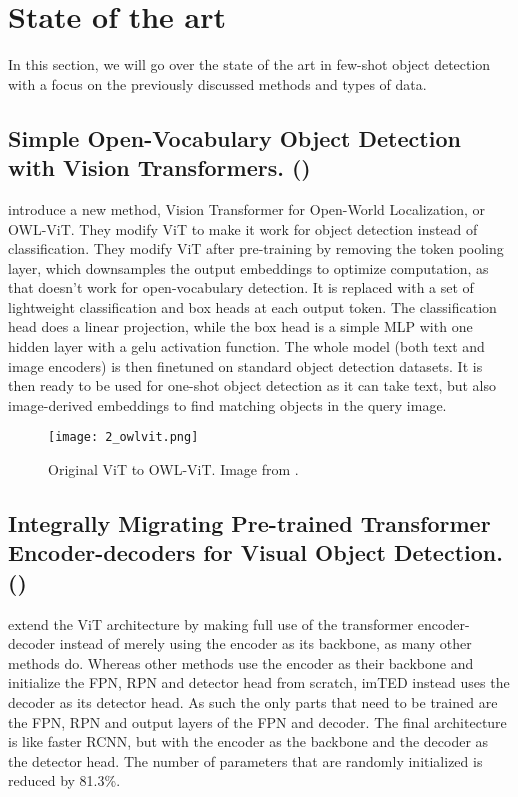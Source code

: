 \section{State of the art} 
In this section, we will go over the state of the art in few-shot object detection with a focus on the previously discussed methods and types of data.

\subsection*{Simple Open-Vocabulary Object Detection
with Vision Transformers. (\citet{owlvit})} \label{sec:2_owlvit}

\citet{owlvit} introduce a new method, Vision Transformer for Open-World Localization, or OWL-ViT. They modify ViT to make it work for object detection instead of classification. They modify ViT after pre-training by removing the token pooling layer, which downsamples the output embeddings to optimize computation, as that doesn't work for open-vocabulary detection. It is replaced with a set of lightweight classification and box heads at each output token. The classification head does a linear projection, while the box head is a simple MLP with one hidden layer with a gelu activation function. The whole model (both text and image encoders) is then finetuned on standard object detection datasets. It is then ready to be used for one-shot object detection as it can take text, but also image-derived embeddings to find matching objects in the query image.

\begin{figure}[h]
	\centering
	\texttt{[image: 2\_owlvit.png]}
	\caption{\label{fig:2_owl-vitr} Original ViT to OWL-ViT. Image from \citet{owlvit}.}
\end{figure}




\subsection*{Integrally Migrating Pre-trained Transformer Encoder-decoders
for Visual Object Detection. (\citet{imTED})}

\citet{imTED} extend the ViT architecture by making full use of the transformer encoder-decoder instead of merely using the encoder as its backbone, as many other methods do. Whereas other methods use the encoder as their backbone and initialize the FPN, RPN and detector head from scratch, imTED instead uses the decoder as its detector head. As such the only parts that need to be trained are the FPN, RPN and output layers of the FPN and decoder. The final architecture is like faster RCNN, but with the encoder as the backbone and the decoder as the detector head. The number of parameters that are randomly initialized is reduced by 81.3\%.


